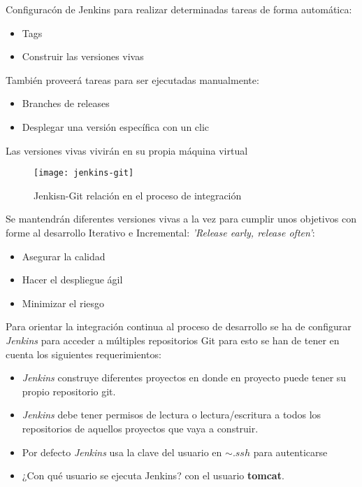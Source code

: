 \par Configuracón de Jenkins para realizar determinadas tareas de forma automática:

\begin{itemize}
	\item Tags
	\item Construir las versiones vivas
\end{itemize}

\par También proveerá tareas para ser ejecutadas manualmente:

\begin{itemize}
	\item Branches de releases
	\item Desplegar una versión específica con un clic
\end{itemize}

\par Las versiones vivas vivirán en su propia máquina virtual

\begin{figure}[H]
    \centering
    \texttt{[image: jenkins-git]}
    \caption{Jenkisn-Git relación en el proceso de integración}
    \label{fig:jenkins-git}
\end{figure}

\par Se mantendrán diferentes versiones vivas a la vez para cumplir unos objetivos con forme al desarrollo Iterativo e Incremental: \emph{'Release early, release often'}:

\begin{itemize}
	\item Asegurar la calidad
	\item Hacer el despliegue ágil
	\item Minimizar el riesgo
\end{itemize}

\par Para orientar la integración continua al proceso de desarrollo se ha de configurar \emph{Jenkins} para acceder a múltiples repositorios Git para esto se han de tener en cuenta los siguientes requerimientos:

\begin{itemize}
    \item \emph{Jenkins} construye diferentes proyectos en donde en proyecto puede tener su propio repositorio git.
    \item \emph{Jenkins} debe tener permisos de lectura o lectura/escritura a todos los repositorios de aquellos proyectos que vaya a construir.
    \item Por defecto \emph{Jenkins} usa la clave del usuario en \texttt{\ensuremath{\sim.ssh}} para autenticarse
    \item ¿Con qué usuario se ejecuta Jenkins? con el usuario \textbf{tomcat}.
\end{itemize}

